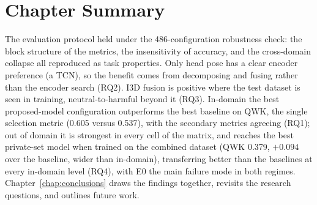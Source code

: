 \documentclass[../main.tex]{subfiles}
\begin{document}
\FloatBarrier
\section{Chapter Summary}
\label{sec:hybrid-summary}

The evaluation protocol held under the 486-configuration robustness check: the block structure of the metrics, the insensitivity of accuracy, and the cross-domain collapse all reproduced as task properties. Only head pose has a clear encoder preference (a TCN), so the benefit comes from decomposing and fusing rather than the encoder search (RQ2). I3D fusion is positive where the test dataset is seen in training, neutral-to-harmful beyond it (RQ3). In-domain the best proposed-model configuration outperforms the best baseline on QWK, the single selection metric (0.605 versus 0.537), with the secondary metrics agreeing (RQ1); out of domain it is strongest in every cell of the matrix, and reaches the best private-set model when trained on the combined dataset (QWK 0.379, $+0.094$ over the baseline, wider than in-domain), transferring better than the baselines at every in-domain level (RQ4), with E0 the main failure mode in both regimes. Chapter~\ref{chap:conclusions} draws the findings together, revisits the research questions, and outlines future work.
\end{document}
